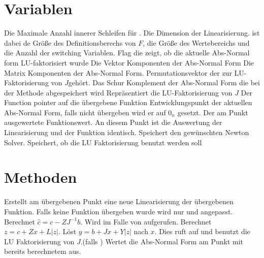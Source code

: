\section[Private Variablen]{\texorpdfstring{}{Private} Variablen}
\begin{description}
 Die Maximale Anzahl innerer Schleifen für .
 Die Dimension der Linearisierung.  ist dabei de Größe des Definitionsberechs von $F$,  die Größe des Wertebereichs und  die Anzahl der switching Variablen.
 Flag die zeigt, ob die aktuelle Abs-Normal form LU-faktorisiert wurde
 Die Vektor Komponenten der Abs-Normal Form
 Die Matrix Komponenten der Abs-Normal Form. 
 Permutationsvektor der zur LU-Faktorisierung von $J$gehört.
 Das Schur Komplement der Abs-Normal Form die bei der Methode  abgespeichert wird
 Repräsentiert die LU-Faktorisierung von $J$
 Der Function pointer auf die übergebene Funktion
 Entwicklungspunkt der aktuellen Abs-Normal Form, falls nicht übergeben wird er auf $0_n$ gesetzt.
 Der am Punkt  ausgewertete Funktionswert. An diesem Punkt ist die Auswertung der Linearisierung und der Funktion identisch.
 Speichert den gewünschten Newton Solver.
 Speichert, ob die LU Faktorisierung benutzt werden soll

\end{description}
\section[Private Methoden]{\texorpdfstring{}{Private} Methoden}
\begin{description}
 Erstellt am übergebenen Punkt eine neue Linearisierung der übergebenen Funktion. Falls keine Funktion übergeben wurde wird nur  und  angepasst.
 Berechnet $\hat c = c - Z J^{-1}b$. Wird im Falle von  aufgerufen.
 Berechnet $z = c + Zx + L|z|$.
 Löst $y = b + Jx + Y|z|$ nach $x$. Dies ruft  auf und benutzt die LU Faktorisierung von $J$.(falls  ) 
 Wertet die Abs-Normal Form am Punkt  mit bereits berechnetem  aus. 
\end{description}